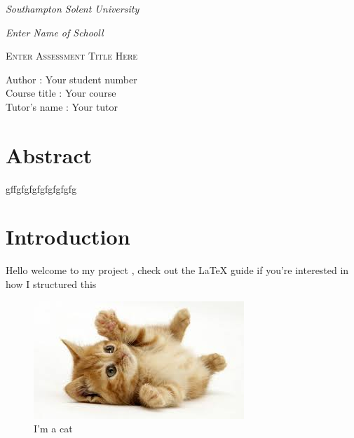 \documentclass[12pt,a4paper]{article}
\begin{document}
\begin{titlepage}
{\fontsize{14}{12} \emph{Southampton Solent University}\par}
{\fontsize{14}{12}  \emph{Enter Name of Schooll} \par}
\centering
\vspace{10 cm}
{\scshape\Huge Enter Assessment Title Here\par}
\vspace{10cm}	
\begin{flushleft}

Author	        \hspace{1.12cm} 	: Your student number   \\
Course title	\hspace{0.2cm} 	: Your course  \\
Tutor's name	\hspace{0.00cm}       : Your tutor   \\

\end{flushleft}
 
\end{titlepage}

\tableofcontents

\clearpage

\listoffigures

\clearpage


\section{Abstract}
gffgfgfgfgfgfgfgfg 
\section{Introduction}

Hello welcome to my project , check out the LaTeX guide if you're interested in how I structured this  \citep{latex:guide}

\begin{figure}[h!]
	\centering
	\includegraphics{assets/cat.jpeg}
	 \caption{I'm a cat}
	 \label{fig:cat}
\end{figure}
\end{document}
